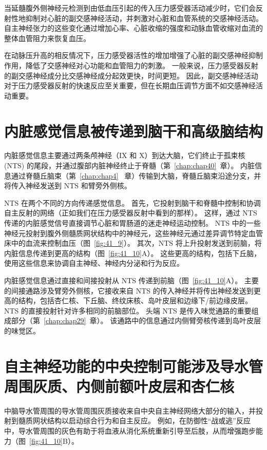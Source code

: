 当延髓腹外侧神经元检测到由低血压引起的传入压力感受器活动减少时，它们会反射性地抑制对心脏的副交感神经活动，并刺激对心脏和血管系统的交感神经活动。
自主神经张力的这些变化通过增加心率、心脏收缩的强度和动脉血管收缩对血流的整体血管阻力来恢复血压。


在动脉压升高的相反情况下，压力感受器活性的增加增强了心脏的副交感神经抑制作用，降低了交感神经对心功能和血管阻力的刺激。
一般来说，压力感受器反射的副交感神经成分比交感神经成分起效更快，时间更短。
因此，副交感神经活动对于压力感受器反射的快速反应至关重要，但在长期血压调节方面不如交感神经活动重要。



\section{内脏感觉信息被传递到脑干和高级脑结构}

内脏感觉信息主要通过两条颅神经（IX 和 X）到达大脑，它们终止于孤束核 (NTS) 的尾段，并通过腹部内脏神经终止于脊髓（第~\ref{chap:chap40}~章）。
内脏信息通过脊髓丘脑束（第~\ref{chap:chap4}~ 章）传输到大脑，脊髓丘脑束沿途分支，并将传入神经发送到 NTS 和臂旁外侧核。


NTS 在两个不同的方向传递感觉信息。
首先，它投射到脑干和脊髓中控制和协调自主反射的网络（正如我们在压力感受器反射中看到的那样）。
这样，通过 NTS 传递的内脏感觉信号直接调节心脏和胃肠道的迷走神经运动控制。
NTS 中的一些神经元投射到腹外侧髓质网状结构中的神经元，这些神经元通过差异调节特定血管床中的血流来控制血压（图~\ref{fig:41_9}）。
其次，NTS 将上升投射发送到前脑，将内脏信息传递到更高的结构（图~\ref{fig:41_10}A）。
这些更高的结构，包括下丘脑，使用这些信息来协调自主神经、神经内分泌和行为反应。


内脏感觉信息通过直接和间接投射从 NTS 传递到前脑（图~\ref{fig:41_10}A）。
主要的间接通路涉及臂旁外侧核，它接收来自 NTS 的传入神经并将传出神经发送到更高的结构，包括杏仁核、下丘脑、终纹床核、岛叶皮层和边缘下/前边缘皮层。
NTS 的直接投射针对许多相同的前脑部位。
头端 NTS 是传入味觉通路的重要组成部分（第~\ref{chap:chap29}~章）。
该通路中的信息通过内侧臂旁核传递到岛叶皮层的味觉区。



\section{自主神经功能的中央控制可能涉及导水管周围灰质、内侧前额叶皮层和杏仁核}

中脑导水管周围的导水管周围灰质接收来自中央自主神经网络大部分的输入，并投射到髓质网状结构以启动综合行为和自主反应。
例如，在防御性“战或逃”反应中，导水管周围的灰色有助于将血液从消化系统重新引导至后肢，从而增强跑步能力（图~\ref{fig:41_10}B）。


